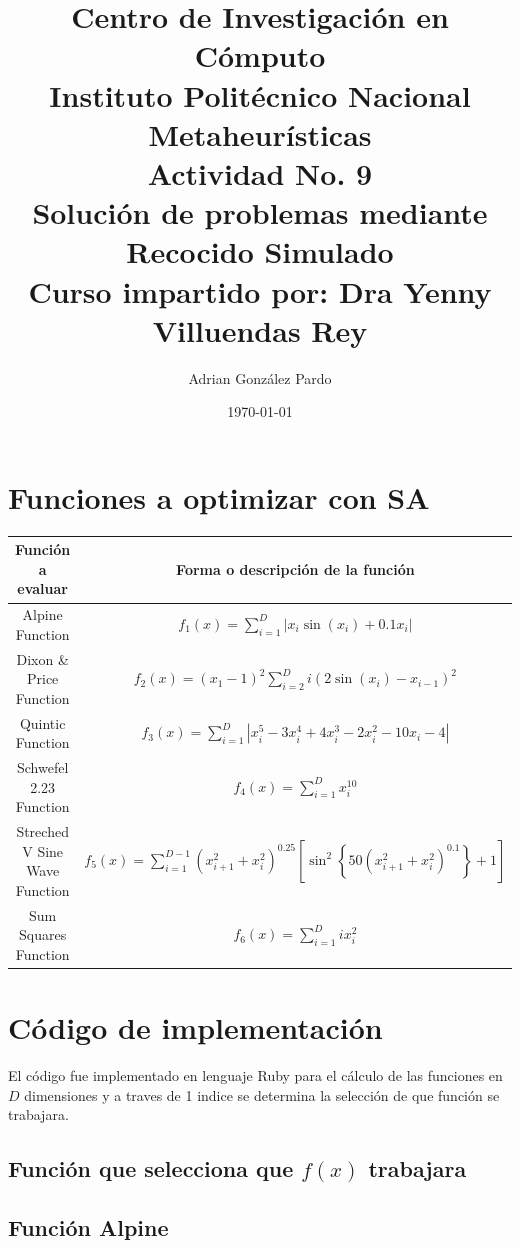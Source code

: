 \documentclass[10pt]{article}
\title{Centro de Investigación en Cómputo\\Instituto Politécnico Nacional\\Metaheurísticas\\Actividad No. 9\\ Solución de problemas mediante Recocido Simulado\\Curso impartido por: Dra Yenny Villuendas Rey}
\author{Adrian González Pardo}
\date{\today}
\begin{document}
\maketitle
\section{Funciones a optimizar con SA}
\begin{center}
  \begin{tabular}{|c|c|}
    \hline
    Función a evaluar & Forma o descripción de la función\\
    \hline
    Alpine Function & \(\displaystyle f_{1}(x)=\sum_{i=1}^{D} \left|x_{i}\sin(x_{i})+0.1x_{i}\right|\) \\
    \hline
    Dixon \& Price Function & \(\displaystyle f_{2}(x)=(x_{1}-1)^{2}\sum_{i=2}^{D} i\left(2\sin(x_{i})-x_{i-1}\right)^{2}\)\\
    \hline
    Quintic Function & \(\displaystyle f_{3}(x)=\sum_{i=1}^{D} \left|x_{i}^{5}-3x_{i}^{4}+4x_{i}^3-2x_{i}^{2}-10x_{i}-4\right|\)\\
    \hline
    Schwefel 2.23 Function & \(\displaystyle f_{4}(x)=\sum_{i=1}^{D}x_{i}^{10}\)\\
    \hline
    Streched V Sine Wave Function & \(\displaystyle f_{5}(x)=\sum_{i=1}^{D-1}(x_{i+1}^{2}+x_{i}^{2})^{0.25}\left[\sin^{2}\left\{50(x_{i+1}^{2}+x_{i}^{2})^{0.1}\right\}+1\right]\)\\
    \hline
    Sum Squares Function & \(\displaystyle f_{6}(x)=\sum_{i=1}^{D}ix_{i}^{2}\)\\
    \hline
  \end{tabular}
\end{center}
\clearpage
\section{Código de implementación}
El código fue implementado en lenguaje Ruby para el cálculo de las funciones en $D$ dimensiones y a traves de 1 indice se determina la selección de que función se trabajara.
\subsection{Función que selecciona que $f(x)$ trabajara}
\begin{center}
  
\end{center}
\subsection{Función Alpine}
\begin{center}
  
\end{center}
\end{document}
